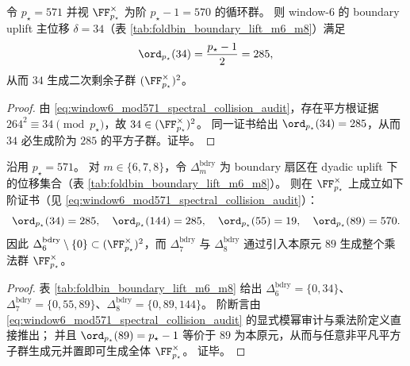 \begin{proposition}[\texorpdfstring{$\delta=34$}{δ=34} 在 \texorpdfstring{$\FF_{p_\star}^\times$}{F*^×} 中生成平方子群]\label{prop:window6-delta34-generates-squares}
令 \(p_\star=571\) 并视 \(\FF_{p_\star}^\times\) 为阶 \(p_\star-1=570\) 的循环群。
则 window-\(6\) 的 boundary uplift 主位移 \(\delta=34\)（表 \ref{tab:foldbin_boundary_lift_m6_m8}）满足
\[
\ord_{p_\star}(34)=\frac{p_\star-1}{2}=285,
\]
从而 \(34\) 生成二次剩余子群 \((\FF_{p_\star}^\times)^2\)。
\end{proposition}
\begin{proof}
由 \eqref{eq:window6_mod571_spectral_collision_audit}，存在平方根证据 \(264^2\equiv 34\pmod{p_\star}\)，故 \(34\in(\FF_{p_\star}^\times)^2\)。
同一证书给出 \(\ord_{p_\star}(34)=285\)，从而 \(34\) 必生成阶为 \(285\) 的平方子群。证毕。
\end{proof}

\begin{proposition}\label{prop:window6-bdry-uplift-residue-stratification}
沿用 \(p_\star=571\)。
对 \(m\in\{6,7,8\}\)，令 \(\Delta_m^{\mathrm{bdry}}\) 为 boundary 扇区在 dyadic uplift 下的位移集合（表 \ref{tab:foldbin_boundary_lift_m6_m8}）。
则在 \(\FF_{p_\star}^\times\) 上成立如下阶证书（见 \eqref{eq:window6_mod571_spectral_collision_audit}）：
\[
\ord_{p_\star}(34)=285,\quad
\ord_{p_\star}(144)=285,\quad
\ord_{p_\star}(55)=19,\quad
\ord_{p_\star}(89)=570.
\]
因此 \(\Delta_6^{\mathrm{bdry}}\setminus\{0\}\subset(\FF_{p_\star}^\times)^2\)，而 \(\Delta_7^{\mathrm{bdry}}\) 与 \(\Delta_8^{\mathrm{bdry}}\) 通过引入本原元 \(89\) 生成整个乘法群 \(\FF_{p_\star}^\times\)。
\end{proposition}
\begin{proof}
表 \ref{tab:foldbin_boundary_lift_m6_m8} 给出 \(\Delta^{\mathrm{bdry}}_6=\{0,34\}\)、\(\Delta^{\mathrm{bdry}}_7=\{0,55,89\}\)、\(\Delta^{\mathrm{bdry}}_8=\{0,89,144\}\)。
阶断言由 \eqref{eq:window6_mod571_spectral_collision_audit} 的显式模幂审计与乘法阶定义直接推出；
并且 \(\ord_{p_\star}(89)=p_\star-1\) 等价于 \(89\) 为本原元，从而与任意非平凡平方子群生成元并置即可生成全体 \(\FF_{p_\star}^\times\)。
证毕。
\end{proof}

